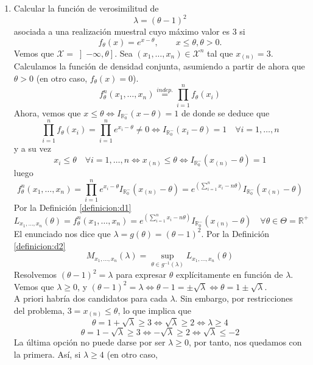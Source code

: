 \documentclass[12pt]{article}
\newcommand{\R}{\mathbb{R}}
\newcommand{\Rmas}{\R^{+}}
\newcommand{\X}{\mathcal{X}}
\begin{document}
\begin{ejercicio}
\begin{enumerate}
            \item[b)] Calcular la función de verosimilitud de $$\lambda=(\theta-1)^2$$
            asociada a una realización muestral cuyo máximo valor es $3$ si $$ f_\theta(x)=e^{x-\theta}, \qquad x \leqslant \theta, \theta>0.$$
            Vemos que $\X = \left]-\infty, \theta \right]$. Sea $(x_1, \ldots, x_n) \in \X^n$ tal que $x_{(n)} = 3$. Calculamos la función de densidad 
            conjunta, asumiendo a partir de ahora que $\theta > 0$ (en otro caso, $f_\theta(x) = 0$).
            $$f_\theta^n(x_1, \ldots, x_n) \stackrel{indep.}{=} \prod_{i=1}^n f_\theta(x_i)$$
            Ahora, vemos que $x \leqslant \theta \iff I_{\R_0^{-}}(x - \theta) = 1$ de donde se deduce que 
            $$\prod_{i=1}^n f_\theta(x_i) = \prod_{i=1}^n e^{x_i - \theta} \neq 0 \iff I_{\R_0^{-}}(x_i - \theta) = 1 \quad \forall i = 1, \ldots, n$$
            y a su vez
            $$x_i \leqslant \theta \quad \forall i = 1, \ldots, n \iff x_{(n)} \leqslant \theta \iff I_{\R_0^{-}}(x_{(n)} - \theta) = 1$$
            luego
            $$f_\theta^n(x_1, \ldots, x_n) = \prod_{i=1}^n e^{x_i - \theta} I_{\R_0^{-}}(x_{(n)} - \theta) = 
            e^{\left(\displaystyle\sum_{i=1}^n x_i - n \theta \right)} I_{\R_0^{-}}(x_{(n)} - \theta)$$
            Por la Definición \ref{definicion:d1}
            $$L_{x_1, \ldots, x_n}(\theta) = f_\theta^n(x_1, \ldots, x_n) = e^{\left(\displaystyle\sum_{i=1}^n x_i - n \theta \right)} I_{\R_0^{-}}(x_{(n)} - \theta)
            \quad \forall \theta \in \Theta = \Rmas$$
            El enunciado nos dice que $\lambda = g(\theta) = (\theta-1)^2$. Por la Definición \ref{definicion:d2}
            $$M_{x_1, \ldots, x_n}(\lambda) = \sup_{\theta \in g^{-1}(\lambda)} L_{x_1, \ldots, x_n}(\theta)$$ 
            Resolvemos $(\theta-1)^2 = \lambda$ para expresar $\theta$ explícitamente en función de $\lambda$. Vemos que $\lambda \geqslant 0$, y 
            $(\theta - 1)^2 = \lambda \iff \theta - 1 = \pm \sqrt{\lambda} \iff \theta = 1 \pm \sqrt{\lambda}$. \\
            A priori habría dos candidatos para cada $\lambda$. Sin embargo, por restricciones del problema, $3 = x_{(n)} \leqslant \theta$, lo que implica que
            $$\theta = 1 + \sqrt{\lambda} \geqslant 3 \iff \sqrt{\lambda} \geqslant 2 \iff \lambda \geqslant 4$$
            $$\theta = 1 - \sqrt{\lambda} \geqslant 3 \iff - \sqrt{\lambda} \geqslant 2 \iff \sqrt{\lambda} \leqslant -2$$
            La última opción no puede darse por ser $\lambda \geqslant 0$, por tanto, nos quedamos con la primera. Así, si $\lambda \geqslant 4$ (en otro caso,

\end{enumerate}
\end{ejercicio}
\end{document}

